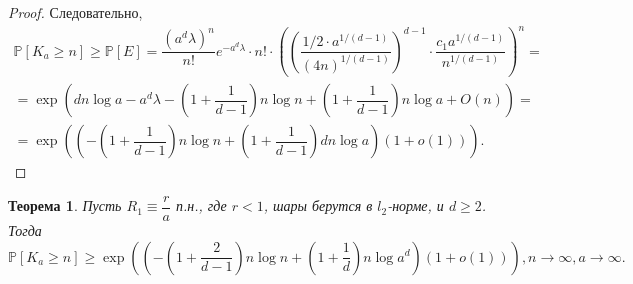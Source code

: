 \documentclass[12pt]{article}
\theoremstyle{plain}
\newtheorem{thm}{Теорема} %
\theoremstyle{definition}
\theoremstyle{remark}
\def\geq{\geqslant}
\newcommand{\PP}{\mathbb{P}}
\begin{document}
\begin{proof}
  
    Следовательно, 
    \begin{multline*}
        \PP[K_a\geq n] \geq \PP[E] = \dfrac{(a^d\lambda)^n}{n!}e^{-a^d\lambda}\cdot n!\cdot \left(\left(\dfrac{1/2\cdot a^{1/(d-1)}}{(4n)^{1/(d-1)}}\right)^{d-1}\cdot \dfrac{c_1a^{1/(d-1)}}{n^{1/(d-1)}}\right)^n = \\
        =\exp\left(dn\log a - a^d\lambda - \left(1+\dfrac{1}{d-1}\right)n\log n + \left(1+\dfrac{1}{d-1}\right) n\log a  + O(n)\right) = \\
        =
        \exp \left(\left(-\left(1+\dfrac{1}{d-1}\right)n\log n + \left(1+\dfrac{1}{d-1}\right)dn\log a\right) (1+o(1))\right).
    \end{multline*}{}

    
\end{proof}{}

\begin{thm}
Пусть $R_1\equiv \dfrac{r}{a}$ п.н., где $r<1$, шары берутся в $l_2$-норме, и $d\geq 2$. Тогда $$\PP[K_a \geq n] \geq \exp \left(\left(-\left(1+\dfrac{2}{d-1}\right)n\log n + \left(1 + \dfrac{1}{d}\right) n\log a^d \right)(1 + o(1))\right), n \to \infty, a\to \infty.$$
\end{thm}{}
\end{document}
